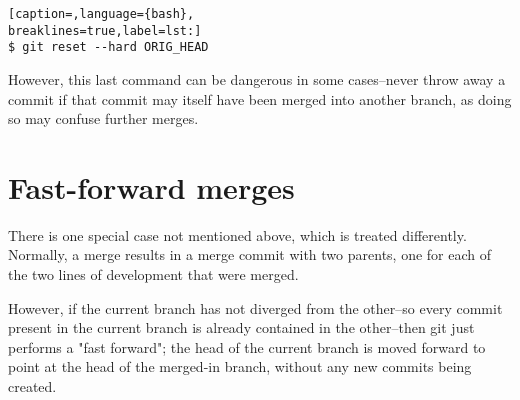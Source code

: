 \lstset{basicstyle=\scriptsize, numbers=none, captionpos=b, tabsize=4}
\begin{lstlisting}[caption=,language={bash},
breaklines=true,label=lst:]
$ git reset --hard ORIG_HEAD
\end{lstlisting}

However, this last command can be dangerous in some cases--never throw away a
commit if that commit may itself have been merged into another branch, as doing
so may confuse further merges.

\section{Fast-forward merges}
There is one special case not mentioned above, which is treated differently.
Normally, a merge results in a merge commit with two parents, one for each of
the two lines of development that were merged.

However, if the current branch has not diverged from the other--so every commit
present in the current branch is already contained in the other--then git just
performs a "fast forward"; the head of the current branch is moved forward to
point at the head of the merged-in branch, without any new commits being
created.
